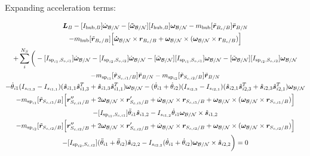 \documentclass[paper]{aiaaNew}
\begin{document}
Expanding acceleration terms:

\begin{multline}
\bm L_B -[I_{\text{hub},B}] \dot{\bm\omega}_{\cal B/N}  -[\bm{\tilde{\omega}}_{\cal B/N}] [I_{\text{hub},B}] \bm\omega_{\cal B/N} - m_{\text{hub}} [\tilde{{\bm r}}_{B_c/B}] \ddot{\bm r}_{B/N} \\
- m_{\text{hub}} [\tilde{{\bm r}}_{B_c/B}] \Big[\bm{\dot{\omega}}_{\cal B/N} \times \bm{r}_{B_c/B} + \bm\omega_{\cal B/N} \times (\bm\omega_{\cal B/N} \times \bm{r}_{B_c/B})\Big]\\
+ \sum\limits_{i}^{N_S}\bigg(-[I_{\text{sp}_{i1},S_{c,i1}}] \dot{\bm \omega}_{\cal{B/N}} -[I_{\text{sp}_{i2},S_{c,i2}}] \dot{\bm \omega}_{\cal{B/N}} -[\tilde{\bm \omega}_{\cal{B/N}}] [I_{\text{sp}_{i1},S_{c,i1}}] \bm \omega_{\cal{B/N}}-[\tilde{\bm \omega}_{\cal{B/N}}] [I_{\text{sp}_{i2},S_{c,i2}}] \bm \omega_{\cal{B/N}}\\
- m_{\text{sp}_{i1}} [\tilde{{\bm r}}_{S_{c,i1}/B}] \ddot{\bm r}_{B/N}- m_{\text{sp}_{i2}} [\tilde{{\bm r}}_{S_{c,i2}/B}] \ddot{\bm r}_{B/N}\\
-\dot{\theta}_{i1} (I_{s_{i1,3}} - I_{s_{i1,1}})( \hat{\bm s}_{i1,1} \hat{\bm s}_{i1,3}^T + \hat{\bm s}_{i1,3} \hat{\bm s}_{i1,1}^T) \bm \omega_{\cal{B/N}} -(\dot{\theta}_{i1}  + \dot{\theta}_{i2})(I_{s_{i2,3}} - I_{s_{i2,1}}) (\hat{\bm s}_{i2,1} \hat{\bm s}_{i2,3}^T + \hat{\bm s}_{i2,3} \hat{\bm s}_{i2,1}^T) \bm \omega_{\cal{B/N}} \\
- m_{\text{sp}_{i1}} [\tilde{{\bm r}}_{S_{c,i1}/B}] \Big[\bm{r}''_{S_{c,i1}/B} + 2 \bm\omega_{\cal B/N} \times \bm{r}'_{S_{c,i1}/B} +  \dot{\bm\omega}_{\cal B/N} \times \bm{r}_{S_{c,i1}/B} + \bm\omega_{\cal B/N} \times (\bm\omega_{\cal B/N} \times \bm{r}_{S_{c,i1}/B})\Big]\\
-[I_{\text{sp}_{i1},S_{c,i1}}] \ddot{\theta}_{i1} \hat{\bm s}_{i1,2} 
-I_{s_{i1,2}} \dot{\theta}_{i1} \bm \omega_{\cal{B/N}} \times \hat{\bm s}_{i1,2}\\
- m_{\text{sp}_{i2}} [\tilde{{\bm r}}_{S_{c,i2}/B}] \Big[ \bm{r}''_{S_{c,i2}/B} + 2 \bm\omega_{\cal B/N} \times \bm{r}'_{S_{c,i2}/B} +  \dot{\bm\omega}_{\cal B/N} \times \bm{r}_{S_{c,i2}/B} + \bm\omega_{\cal B/N} \times (\bm\omega_{\cal B/N} \times \bm{r}_{S_{c,i2}/B})\Big]\\
-[I_{\text{sp}_{i2},S_{c,i2}}] (\ddot{\theta}_{i1}  + \ddot{\theta}_{i2})\hat{\bm s}_{i2,2} 
-I_{s_{i2,2}}  (\dot{\theta}_{i1}  + \dot{\theta}_{i2}) \bm \omega_{\cal{B/N}} \times \hat{\bm s}_{i2,2} \bigg) = 0
\end{multline}
\end{document}
